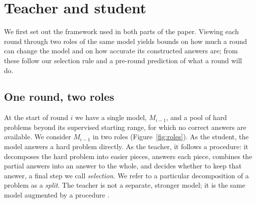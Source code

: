 \section{Teacher and student}
\label{sec:teacher-and-student}

We first set out the framework used in both parts of the paper. Viewing each
round through two roles of the same model yields bounds on how much a round can
change the model and on how accurate its constructed answers are; from these
follow our selection rule and a pre-round prediction of what a round will do.

\subsection{One round, two roles}
\label{sec:two-roles}

At the start of round $i$ we have a single model, $M_{i-1}$, and a pool of hard
problems beyond its supervised starting range, for which no correct answers are
available. We consider $M_{i-1}$ in two roles (Figure~\ref{fig:roles}). As
the student, the model answers a hard problem directly. As the teacher, it
follows a procedure: it decomposes the hard problem into easier pieces, answers
each piece, combines the partial answers into an answer to the whole, and
decides whether to keep that answer, a final step we call \emph{selection}. We
refer to a particular decomposition of a problem as a \emph{split}. The teacher
is not a separate, stronger model; it is the same model augmented by a
procedure \citep{lopezpaz2016unifying, zhang2026basersi}.

